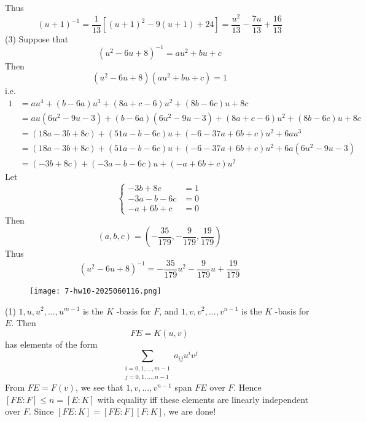 Thus
\[
(u+1)^{-1}=\frac{1}{13}[(u+1)^2-9(u+1)+24]=\frac{u^2}{13}-\frac{7 u}{13}+\frac{16}{13}
\]
(3)
Suppose that
\[
(u^2-6u+8)^{-1}=au^2+bu+c
\]
Then
\[
(u^2-6u+8)(au^2+bu+c)=1
\]
i.e.
\[
\begin{aligned}
1 & =au^{4}+(b-6a)u^3+(8a+c-6)u^2+(8b-6c)u+8c \\
 & =au(6u^2-9u-3)+(b-6a)(6u^2-9u-3)+(8a+c-6)u^2+(8b-6c)u+8c \\
 & =(18a-3b+8c)+(51a-b-6c)u+(-6-37a+6b+c)u^2+6au^3 \\
 & =(18a-3b+8c)+(51a-b-6c)u+(-6-37a+6b+c)u^2+6a(6u^2-9u-3) \\
 & =(-3b+8c)+(-3a-b-6c)u+(-a+6b+c)u^2
\end{aligned}
\]
Let
\[
\begin{cases}
-3b+8c & =1 \\
-3a-b-6c & =0 \\
-a+6b+c & =0
\end{cases}
\]
Then
\[
(a,b,c)=\left( -\frac{35}{179},-\frac{9}{179},\frac{19}{179}    \right)
\]
Thus
\[
(u^2-6u+8)^{-1}=-\frac{35}{179}u^2-\frac{9}{179}u+\frac{19}{179} 
\]
\begin{exercise}
\begin{figure}[H]
\centering
\texttt{[image: 7-hw10-2025060116.png]}
\label{}
\end{figure}
\end{exercise}
(1)
$1,u,u^2,\dots,u^{m-1}$ is the $K$ -basis for $F$, and $1,v,v^2,\dots,v^{n-1}$ is the $K$ -basis for $E$. Then
\[
FE=K(u,v)
\]
has elements of the form
\[
\sum_{\substack{i=0,1,\dots,m-1\\j=0,1,\dots,n-1}}a_{ij}u^{i}v^{j}
\]
From $FE=F(v)$, we see that $1, v, \dots,v^{n-1}$ span $FE$ over $F$. Hence $[FE:F]\leq n=[E:K]$ with equality iff these elements are linearly independent over $F$. Since $[FE:K]=[FE:F][F:K]$, we are done!


